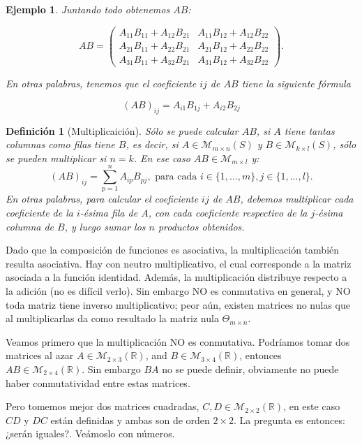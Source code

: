 \documentclass[12pt]{book}
\newtheorem{defi}{Definici\'on}
\newtheorem{ejem}{Ejemplo}
\def\pq{\vspace{0.5cm}}
\def\R{\mathbb{R}}
\begin{document}
\begin{ejem}
Juntando todo obtenemos $AB$:

$$AB=\left(\begin{array}{cc} A_{11}B_{11}+A_{12}B_{21}&A_{11}B_{12}+A_{12}B_{22}\\ A_{21}B_{11}+A_{22}B_{21}&A_{21}B_{12}+A_{22}B_{22}\\ A_{31}B_{11}+A_{32}B_{21}&A_{31}B_{12}+A_{32}B_{22}\end{array}\right).$$

En otras palabras, tenemos que el coeficiente $ij$ de $AB$ tiene la siguiente fórmula

$$(AB)_{ij}=A_{i1}B_{1j}+A_{i2}B_{2j}$$

\end{ejem}


\pq


\begin{defi}[Multiplicaición]
Sólo se puede calcular $AB$, si $A$ tiene tantas columnas como filas tiene $B$, es decir, si $A\in\mathcal{M}_{m\times n}(S)$ y $B\in\mathcal{M}_{k\times l}(S)$, sólo se pueden multiplicar si $n=k$. En ese caso $AB\in\mathcal{M}_{m\times l}$ y:
$$ (AB)_{ij}=\sum_{p=1}^nA_{ip}B_{pj}, \textrm{ para cada } i\in\{1,...,m\}, j\in\{1,...,l\}.$$
En otras palabras, para calcular el coeficiente $ij$ de $AB$, debemos multiplicar cada coeficiente de la $i$-ésima fila de $A$, con cada coeficiente respectivo de la $j$-ésima columna de $B$, y luego sumar los $n$ productos obtenidos. 
\end{defi}

Dado que la composición de funciones es asociativa, la multiplicación también resulta asociativa.
Hay con neutro multiplicativo, el cual corresponde a la matriz asociada a la función identidad.
Además, la multiplicación distribuye respecto a la adición (no es difícil verlo).
Sin embargo NO es conmutativa en general, y NO toda matriz tiene inverso multiplicativo; peor aún, existen matrices no nulas que al multiplicarlas da como resultado la matriz nula $\Theta_{m\times n}$.

Veamos primero que la multiplicación NO es conmutativa.
Podríamos tomar dos matrices al azar $A\in\mathcal{M}_{2\times3}(\R)$, and $B\in\mathcal{M}_{3\times4}(\R)$, entonces $AB\in\mathcal{M}_{2\times 4}(\R)$.
Sin embargo $BA$ no se puede definir, obviamente no puede haber conmutatividad entre estas matrices.

Pero tomemos mejor dos matrices cuadradas, $C,D\in\mathcal{M}_{2\times2}(\R)$, en este caso $CD$ y $DC$ están definidas y ambas son de orden $2\times2$.
La pregunta es entonces: ¿serán iguales?.
Veámoslo con números.
\end{document}
